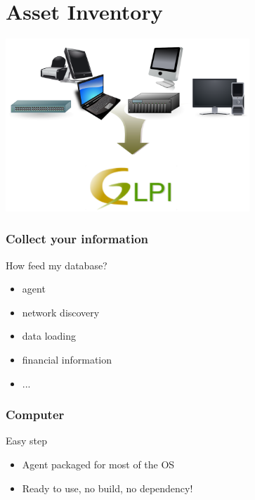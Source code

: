 \documentclass{beamer}
\begin{document}
\section{Asset Inventory}

\begin{frame}
\includegraphics[height=6.5cm]{pics/bigpicture.pdf}
\end{frame}


\begin{frame}

    \frametitle{Collect your information}


    \begin{block}{How feed my database?}
        \begin{itemize}
            \item agent
            \item network discovery
            \item data loading
            \item financial information
            \item ...
        \end{itemize}
    \end{block}

\end{frame}

\begin{frame}

    \frametitle{Computer}

    \begin{block}{Easy step}
        \begin{itemize}
            \item Agent packaged for most of the OS
            \item Ready to use, no build, no dependency!
        \end{itemize}
    \end{block}

\end{frame}
\end{document}
